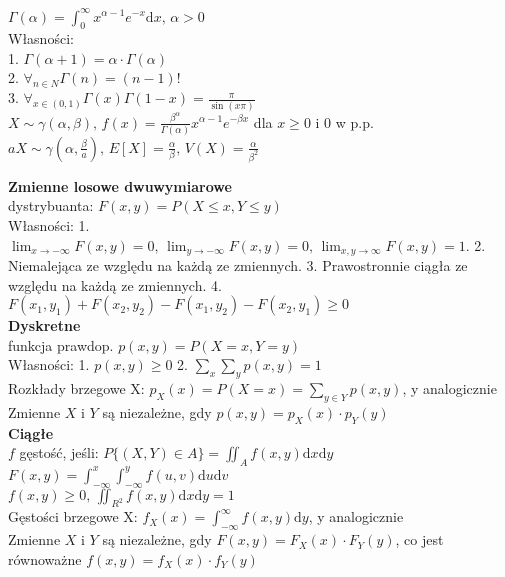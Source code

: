 \documentclass[10pt,landscape,a4paper,notitlepage]{article}
\begin{document}
\begin{multicols*}{4}
        $\Gamma(\alpha)=\int_0^{\infty}x^{\alpha-1}e^{-x}\mathrm{d}x,\,\alpha>0$\\
        Własności:\\
        1. $\Gamma(\alpha+1)=\alpha\cdot\Gamma(\alpha)$\\
        2. $\forall_{n\in N}\Gamma(n)=(n-1)!$\\
        3. $\forall_{x\in(0,1)}\Gamma(x)\Gamma(1-x)=\frac{\pi}{\sin(x\pi)}$\\
        $X\sim \gamma(\alpha,\beta),\,f(x)=\frac{\beta^{\alpha}}{\Gamma(\alpha)}x^{\alpha-1}e^{-\beta x}$ dla $x\geq 0$ i $0$ w p.p.\\
        $aX\sim\gamma(\alpha,\frac{\beta}{a}),\,E[X]=\frac{\alpha}{\beta},\,V(X)=\frac{\alpha}{\beta^2}$

        \noindent\textbf{\large Zmienne losowe dwuwymiarowe}\\
        dystrybuanta: $F(x,y)=P(X\leq x,Y\leq y)$\\
        Własności: 
        1. $\lim_{x\rightarrow-\infty}F(x,y)=0,\,\lim_{y\rightarrow-\infty}F(x,y)=0,\,\lim_{x,y\rightarrow\infty}F(x,y)=1$.
        2. Niemalejąca ze względu na każdą ze zmiennych.
        3. Prawostronnie ciągła ze względu na każdą ze zmiennych.
        4. $F(x_1,y_1)+F(x_2,y_2)-F(x_1,y_2)-F(x_2,y_1)\geq 0$\\
        \textbf{Dyskretne}\\
        funkcja prawdop. $p(x,y)=P(X=x,Y=y)$\\
        Własności:
        1. $p(x,y)\geq 0$
        2. $\sum_x\sum_yp(x,y)=1$\\
        Rozkłady brzegowe X: $p_X(x)=P(X=x)=\sum_{y\in Y}p(x,y)$, y analogicznie\\
        Zmienne $X$ i $Y$ są niezależne, gdy $p(x,y)=p_X(x)\cdot p_Y(y)$\\
        \textbf{Ciągłe}\\
        $f$ gęstość, jeśli: 
        $P\{(X,Y)\in A\}=\iint_Af(x,y)\mathrm{d}x\mathrm{d}y$\\
        $F(x,y)=\int_{-\infty}^x\int_{-\infty}^yf(u,v)\mathrm{d}u\mathrm{d}v$\\
        $f(x,y)\geq 0,\,\iint_{R^2}f(x,y)\mathrm{d}x\mathrm{d}y=1$\\
        Gęstości brzegowe X: $f_X(x)=\int_{-\infty}^{\infty}f(x,y)\mathrm{d}y$, y analogicznie\\
        Zmienne $X$ i $Y$ są niezależne, gdy $F(x,y)=F_X(x)\cdot F_Y(y)$, co jest równoważne $f(x,y)=f_X(x)\cdot f_Y(y)$\\

\end{multicols*}
\end{document}
